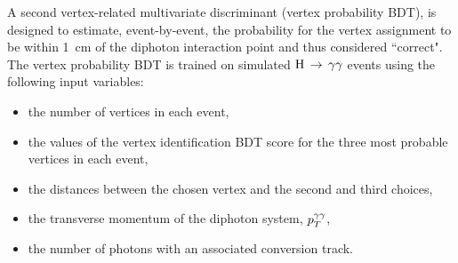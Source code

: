 A second vertex-related multivariate discriminant (vertex probability BDT),
is designed to estimate, event-by-event, the probability for the vertex
assignment to be within \SI{1}{cm} of the diphoton interaction point
and thus considered ``correct".
The vertex probability BDT is trained on simulated $\mathrm{H}\,\rightarrow\,\gamma\gamma$ events using
the following input variables:
\begin{itemize}
        \item the number of vertices in each event,
        \item the values of the vertex identification BDT score for
                the three most probable vertices in each event,
        \item the distances between the chosen vertex and the second and
                third choices,
        \item the transverse momentum of the diphoton system, $p_T^{\gamma\gamma}$,
        \item the number of photons with an associated conversion track.
\end{itemize}

